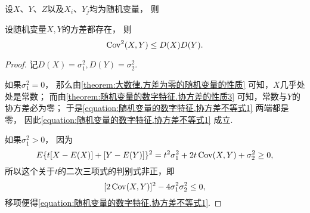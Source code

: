 \begin{property}\label{theorem:随机变量的数字特征.协方差的性质3}
设\(X\)、\(Y\)、\(Z\)以及\(X_i\)、\(Y_j\)均为随机变量，
则
\end{property}

\begin{theorem}
设随机变量\(X,Y\)的方差都存在，
则\begin{equation}\label{equation:随机变量的数字特征.协方差不等式1}
    \operatorname{Cov}^2(X,Y) \leq D(X) D(Y).
\end{equation}
\begin{proof}
记\(D(X) = \sigma_1^2,
D(Y) = \sigma_2^2\).

如果\(\sigma_1^2=0\)，
那么由\cref{theorem:大数律.方差为零的随机变量的性质} 可知，\(X\)几乎处处是常数；
而由\cref{theorem:随机变量的数字特征.协方差的性质3} 可知，常数与\(Y\)的协方差必为零；
于是\cref{equation:随机变量的数字特征.协方差不等式1} 两端都是零，
因此\cref{equation:随机变量的数字特征.协方差不等式1} 成立.

如果\(\sigma_1^2>0\)，
因为\[
	E\{t[X-E(X)]+[Y-E(Y)]\}^2
	= t^2 \sigma_1^2
	+ 2t \operatorname{Cov}(X,Y)
	+ \sigma_2^2
	\geq 0,
\]
所以这个关于\(t\)的二次三项式的判别式非正，即\[
	[2\operatorname{Cov}(X,Y)]^2 - 4 \sigma_1^2 \sigma_2^2 \leq 0,
\]
移项便得\cref{equation:随机变量的数字特征.协方差不等式1}.
\end{proof}
\end{theorem}

